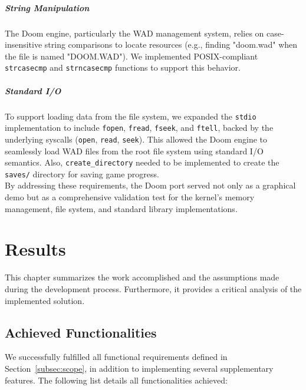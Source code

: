 \documentclass[a4paper,10pt,twoside]{report}
\theoremstyle{definition}
\begin{document}
\paragraph{String Manipulation}
The Doom engine, particularly the WAD management system, relies on case-insensitive string comparisons to locate resources (e.g., finding "doom.wad" when the file is named "DOOM.WAD"). We implemented POSIX-compliant \texttt{strcasecmp} and \texttt{strncasecmp} functions to support this behavior.

\paragraph{Standard I/O}
To support loading data from the file system, we expanded the \texttt{stdio} implementation to include \texttt{fopen}, \texttt{fread}, \texttt{fseek}, and \texttt{ftell}, backed by the underlying syscalls (\texttt{open}, \texttt{read}, \texttt{seek}). This allowed the Doom engine to seamlessly load WAD files from the root file system using standard I/O semantics. Also, \texttt{create\_directory} needed to be implemented to create the \texttt{saves/} directory for saving game progress. \\

\enlargethispage{\baselineskip}
By addressing these requirements, the Doom port served not only as a graphical demo but as a comprehensive validation test for the kernel's memory management, file system, and standard library implementations.

\chapter{Results}
\label{sec:results}

This chapter summarizes the work accomplished and the assumptions made during the development process. Furthermore, it provides a critical analysis of the implemented solution.

\section{Achieved Functionalities}

We successfully fulfilled all functional requirements defined in Section~\ref{subsec:scope}, in addition to implementing several supplementary features. The following list details all functionalities achieved:
\end{document}
